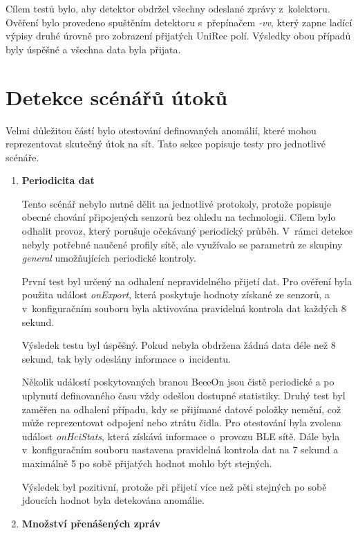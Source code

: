 Cílem testů bylo, aby detektor obdržel všechny odeslané zprávy z~kolektoru. Ověření bylo provedeno
spuštěním detektoru s~přepínačem \textit{-vv}, který zapne ladící výpisy druhé úrovně pro zobrazení 
přijatých UniRec polí. Výsledky obou případů byly úspěšné a všechna data byla přijata.

\section{Detekce scénářů útoků} \label{testAttack}
Velmi důležitou částí bylo otestování definovaných anomálií, které mohou reprezentovat skutečný
útok na sít. Tato sekce popisuje testy pro jednotlivé scénáře.

  \begin{enumerate}
    \item \textbf{Periodicita dat}
    
    Tento scénář nebylo nutné dělit na jednotlivé protokoly, protože popisuje obecné chování 
    připojených senzorů bez ohledu na technologii. Cílem bylo odhalit provoz, který porušuje
    očekávaný periodický průběh. V~rámci detekce nebyly potřebné naučené profily sítě, 
    ale využívalo se parametrů ze skupiny \textit{general} umožňujících periodické kontroly.
    
    První test byl určený na odhalení nepravidelného přijetí dat. Pro ověření byla použita událost
    \textit{onExport}, která poskytuje hodnoty získané ze senzorů, a v~konfiguračním souboru byla 
    aktivována pravidelná kontrola dat každých 8 sekund.
    
    Výsledek testu byl úspěšný. Pokud nebyla obdržena žádná data déle než 8 sekund, tak byly
    odeslány informace o~incidentu.
    
    Několik událostí poskytovaných branou BeeeOn jsou čistě periodické a po uplynutí definovaného
    času vždy odešlou dostupné statistiky. Druhý test byl zaměřen na odhalení případu, kdy se 
    přijímané datové položky nemění, což může reprezentovat odpojení nebo ztrátu čidla. Pro 
    otestování byla zvolena událost \textit{onHciStats}, která získává informace o~provozu BLE sítě. 
    Dále byla v~konfiguračním souboru nastavena pravidelná kontrola dat na 7 sekund a maximálně 
    5 po sobě přijatých hodnot mohlo být stejných. 
    
    Výsledek byl pozitivní, protože při přijetí více než pěti stejných po sobě jdoucích
    hodnot byla detekována anomálie.
    
    \item \textbf{Množství přenášených zpráv}
    

\end{enumerate}
